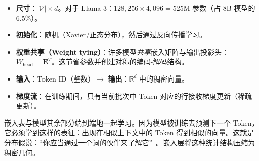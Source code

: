 \begin{keybox}
\begin{itemize}
  \item \textbf{尺寸}：$|\mathcal{V}| \times d$。对于 Llama-3：$128{,}256 \times 4{,}096 = 525$M 参数（占 8B 模型的 6.5\%）。
  \item \textbf{初始化}：随机（Xavier/正态分布），然后通过反向传播学习。
  \item \textbf{权重共享（Weight tying）}：许多模型\emph{共享}嵌入矩阵与输出投影头：$W_{\text{head}} = \mathbf{E}^T$。这节省参数并创建对称的编码-解码结构。
  \item \textbf{输入}：Token ID（整数）$\to$ \textbf{输出}：$\mathbb{R}^d$ 中的稠密向量。
  \item \textbf{梯度流}：在训练期间，只有当前批次中 Token 对应的行接收梯度更新（稀疏更新）。
\end{itemize}
\end{keybox}

\begin{intuitionbox}[为什么嵌入有效]
嵌入表与模型其余部分端到端地一起学习。因为模型被训练去预测下一个 Token，它必须学到这样的表征：出现在相似上下文中的 Token 得到相似的向量。这就是分布假说：``你应当通过一个词的伙伴来了解它''~\cite{firth1957synopsis}。嵌入层将这种统计结构压缩为稠密几何。
\end{intuitionbox}

